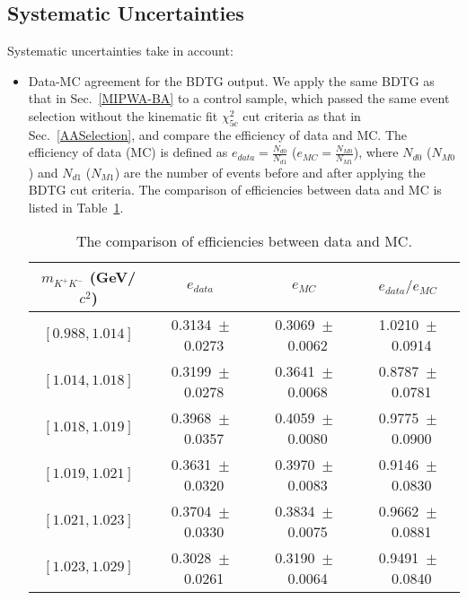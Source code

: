 \subsection{Systematic Uncertainties}
\label{MIPWA-SYS}
\par{
    Systematic uncertainties take in account:
    \begin{itemize}
        \item \uppercase\expandafter{} Data-MC agreement for the BDTG output. 
            We apply the same BDTG as that in Sec.~\ref{MIPWA-BA} to a control sample, which passed the same event selection without the kinematic fit $\chi_{5c}^{2}$ cut criteria as that in Sec.~\ref{AASelection}, and compare the efficiency of data and MC.
            The efficiency of data (MC) is defined as $e_{data} = \frac{N_{d0}}{N_{d1}}$ ($e_{MC} = \frac{N_{M0}}{N_{M1}}$), where $N_{d0}$ ($N_{M0}$) and $N_{d1}$ ($N_{M1}$) are the number of events before and after applying the BDTG cut criteria.
            The comparison of efficiencies between data and MC is listed in Table~\ref{BDTG-SYS}.
            \begin{table}[htbp]
                \caption{The comparison of efficiencies between data and MC.}
                \label{BDTG-SYS}
                \begin{center}
                    \begin{tabular}{cccc}
                        \toprule\toprule
                        $m_{K^{+}K^{-}}$ (GeV/$c^{2}$) &  $e_{data} $ &  $e_{MC}$&  $e_{data} / e_{MC}$   \\
                        \hline
                        $[0.988, 1.014]$ &                0.3134\ $\pm$\ 0.0273 & 0.3069\ $\pm$\ 0.0062 & 1.0210\ $\pm$\ 0.0914 \\  
                        $[1.014, 1.018]$ &                0.3199\ $\pm$\ 0.0278 & 0.3641\ $\pm$\ 0.0068 & 0.8787\ $\pm$\ 0.0781 \\
                        $[1.018, 1.019]$ &                0.3968\ $\pm$\ 0.0357 & 0.4059\ $\pm$\ 0.0080 & 0.9775\ $\pm$\ 0.0900 \\
                        $[1.019, 1.021]$ &                0.3631\ $\pm$\ 0.0320 & 0.3970\ $\pm$\ 0.0083 & 0.9146\ $\pm$\ 0.0830 \\
                        $[1.021, 1.023]$ &                0.3704\ $\pm$\ 0.0330 & 0.3834\ $\pm$\ 0.0075 & 0.9662\ $\pm$\ 0.0881 \\
                        $[1.023, 1.029]$ &                0.3028\ $\pm$\ 0.0261 & 0.3190\ $\pm$\ 0.0064 & 0.9491\ $\pm$\ 0.0840 \\

\end{tabular}
\end{center}
\end{table}
\end{itemize}}
